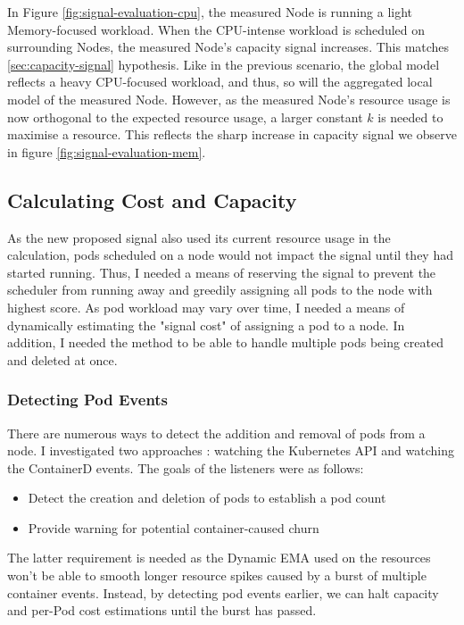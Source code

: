 In Figure \ref{fig:signal-evaluation-cpu}, the measured Node is running a light
Memory-focused workload. When the CPU-intense workload is scheduled on surrounding
Nodes, the measured Node's capacity signal increases. This matches
\ref{sec:capacity-signal} hypothesis. Like in the previous scenario, the global model
reflects a heavy CPU-focused workload, and thus, so will the aggregated local
model of the measured Node. However, as the measured Node's resource usage is
now orthogonal to the expected resource usage, a larger constant $k$ is needed
to maximise a resource. This reflects the sharp increase in capacity signal we
observe in figure \ref{fig:signal-evaluation-mem}.

\subsection{Calculating Cost and Capacity}
As the new proposed signal also used its current resource usage in the
calculation, pods scheduled on a node would not impact the signal until they had
started running. Thus, I needed a means of reserving the signal to prevent the
scheduler from running away and greedily assigning all pods to the node with
highest score. As pod workload may vary over time, I needed a means of
dynamically estimating the "signal cost" of assigning a pod to a node. In
addition, I needed the method to be able to handle multiple pods being created
and deleted at once.

\subsubsection{Detecting Pod Events}
\label{sec:listeners-comparison}
There are numerous ways to detect the addition and removal of pods from a node.
I investigated two approaches : watching the Kubernetes API and watching the
ContainerD events. The goals of the listeners were as follows:
\begin{itemize}
    \item Detect the creation and deletion of pods to establish a pod count
    \item Provide warning for potential container-caused churn
\end{itemize}
The latter requirement is needed as the Dynamic EMA used on the resources won't
be able to smooth longer resource spikes caused by a burst of multiple container
events. Instead, by detecting pod events earlier, we can halt capacity and
per-Pod cost estimations until the burst has passed.

